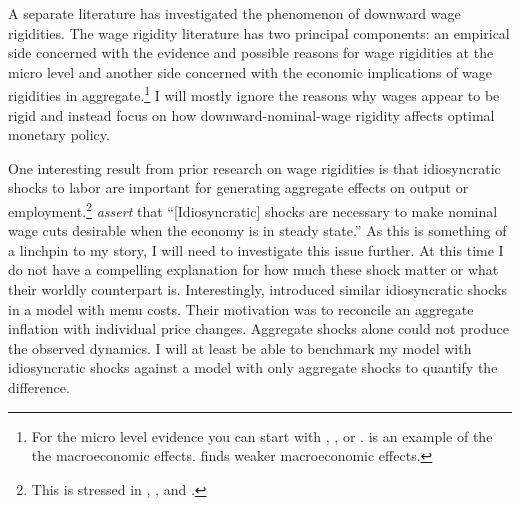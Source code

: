 \documentclass[12pt,a4paper]{article}            %
\begin{document}

A separate literature has investigated the phenomenon of downward wage rigidities.
The wage rigidity literature has two principal components: an empirical side concerned with the evidence and possible reasons for wage rigidities at the micro level and another side concerned with the economic implications of wage rigidities in aggregate.\footnote{For the micro level evidence you can start with \cite{dickens_et_al_2006}, \cite{akerlof_dickens_perry_1996}, or \cite{card_hyslop_1997}. \cite{erceg_henderson_levin_1999} is an example of the the macroeconomic effects.  \cite{elsby_2009} finds weaker macroeconomic effects.}
I will mostly ignore the reasons why wages appear to be rigid and instead focus on how downward-nominal-wage rigidity affects optimal monetary policy.

One interesting result from prior research on wage rigidities is that idiosyncratic shocks to labor are important for generating aggregate effects on output or employment.\footnote{This is stressed in \cite{elsby_2009}, \cite{benigno_ricci_2011}, and \cite{daly_hobijn_2013}.}
\cite{daly_hobijn_2013} \emph{assert} that ``[Idiosyncratic] shocks are necessary to make nominal wage cuts desirable when the economy is in steady state.''
As this is something of a linchpin to my story, I will need to investigate this issue further.
At this time I do not have a compelling explanation for how much these shock matter or what their worldly counterpart is.
Interestingly, \cite{golosov_lucas_2007} introduced similar idiosyncratic shocks in a model with menu costs.
Their motivation was to reconcile an aggregate inflation with individual price changes.
Aggregate shocks alone could not produce the observed dynamics.
I will at least be able to benchmark my model with idiosyncratic shocks against a model with only aggregate shocks to quantify the difference.

\end{document}
